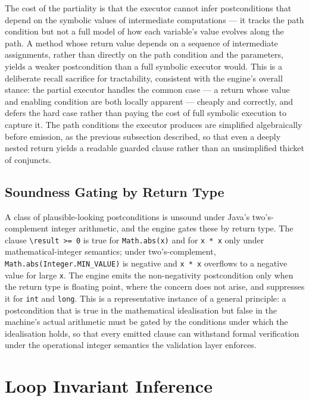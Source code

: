 The cost of the partiality is that the executor cannot infer postconditions that
depend on the symbolic values of intermediate computations --- it tracks the path
condition but not a full model of how each variable's value evolves along the
path. A method whose return value depends on a sequence of intermediate
assignments, rather than directly on the path condition and the parameters, yields
a weaker postcondition than a full symbolic executor would. This is a deliberate
recall sacrifice for tractability, consistent with the engine's overall stance:
the partial executor handles the common case --- a return whose value and enabling
condition are both locally apparent --- cheaply and correctly, and defers the
hard case rather than paying the cost of full symbolic execution to capture it.
The path conditions the executor produces are simplified algebraically before
emission, as the previous subsection described, so that even a deeply nested return
yields a readable guarded clause rather than an unsimplified thicket of conjuncts.

\subsection{Soundness Gating by Return Type}

A class of plausible-looking postconditions is unsound under Java's
two's-complement integer arithmetic, and the engine gates these by return
type. The clause \texttt{\textbackslash result >= 0} is true for
\texttt{Math.abs(x)} and for \texttt{x * x} only under mathematical-integer
semantics; under two's-complement, \texttt{Math.abs(Integer.MIN\_VALUE)} is
negative and \texttt{x * x} overflows to a negative value for large \texttt{x}.
The engine emits the non-negativity postcondition only when the return type is
floating point, where the concern does not arise, and suppresses it for
\texttt{int} and \texttt{long}. This is a representative instance of a general
principle: a postcondition that is true in the mathematical idealisation but
false in the machine's actual arithmetic must be gated by the conditions under
which the idealisation holds, so that every emitted clause can withstand formal
verification under the operational integer semantics the validation layer
enforces.

\section{Loop Invariant Inference}
\label{sec:inf-loops}

